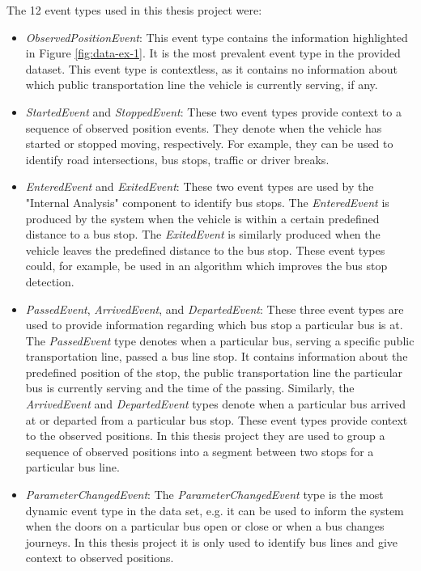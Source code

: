 The 12 event types used in this thesis project were:
\begin{itemize}
    \item \textit{ObservedPositionEvent}:
    This event type contains the information highlighted in Figure \ref{fig:data-ex-1}.
    It is the most prevalent event type in the provided dataset.
    This event type is contextless, as it contains no information about which public transportation line the vehicle is currently serving, if any. 
    
    \item \textit{StartedEvent} and \textit{StoppedEvent}:
    These two event types provide context to a sequence of observed position events.
    They denote when the vehicle has started or stopped moving, respectively.
    For example, they can be used to identify road intersections, bus stops, traffic or driver breaks.
    
    \item \textit{EnteredEvent} and \textit{ExitedEvent}:
    These two event types are used by the "Internal Analysis" component to identify bus stops.
    The \textit{EnteredEvent} is produced by the system when the vehicle is within a certain predefined distance to a bus stop.
    The \textit{ExitedEvent} is similarly produced when the vehicle leaves the predefined distance to the bus stop.
    These event types could, for example, be used in an algorithm which improves the bus stop detection.
    
    \item \textit{PassedEvent}, \textit{ArrivedEvent}, and \textit{DepartedEvent}:
    These three event types are used to provide information regarding which bus stop a particular bus is at.
    The \textit{PassedEvent} type denotes when a particular bus, serving a specific public transportation line, passed a bus line stop.
    It contains information about the predefined position of the stop, the public transportation line the particular bus is currently serving and the time of the passing.
    Similarly, the \textit{ArrivedEvent} and \textit{DepartedEvent} types denote when a particular bus arrived at or departed from a particular bus stop.
    These event types provide context to the observed positions.
    In this thesis project they are used to group a sequence of observed positions into a segment between two stops for a particular bus line.
    
    \item \textit{ParameterChangedEvent}:  
    The \textit{ParameterChangedEvent} type is the most dynamic event type in the data set, e.g. it can be used to inform the system when the doors on a particular bus open or close or when a bus changes journeys.
    In this thesis project it is only used to identify bus lines and give context to observed positions.
    

\end{itemize}

